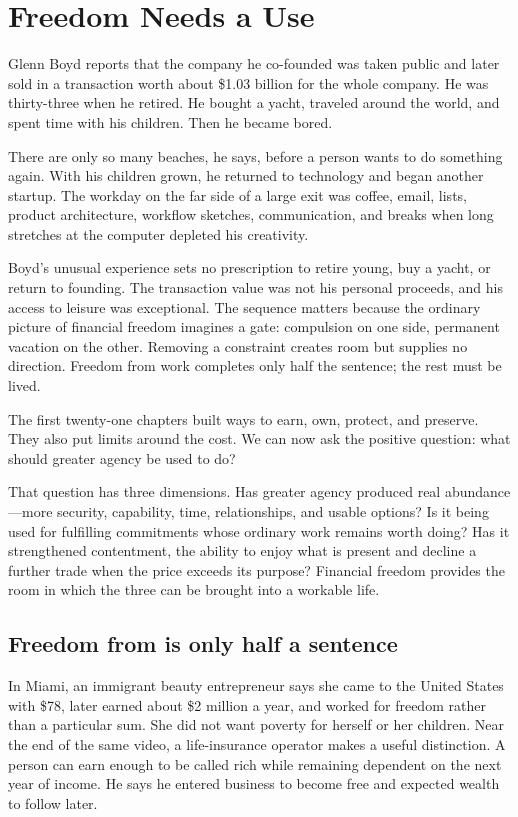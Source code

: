 \chapter{Freedom Needs a Use}

Glenn Boyd reports that the company he co-founded was taken public and later
sold in a transaction worth about \$1.03 billion for the whole company. He was
thirty-three when he retired. He bought a yacht, traveled around the world,
and spent time with his children. Then he became bored.

There are only so many beaches, he says, before a person wants to do something
again. With his children grown, he returned to technology and began another
startup. The workday on the far side of a large exit was coffee, email, lists,
product architecture, workflow sketches, communication, and breaks when long
stretches at the computer depleted his creativity.

Boyd's unusual experience sets no prescription to retire young, buy a yacht,
or return to founding. The transaction value was not his personal proceeds,
and his access to leisure was exceptional. The sequence matters because the
ordinary picture of financial freedom imagines a gate: compulsion on one side,
permanent vacation on the other. Removing a constraint creates room but
supplies no direction. Freedom from work completes only half the sentence; the
rest must be lived.

The first twenty-one chapters built ways to earn, own, protect, and preserve.
They also put limits around the cost. We can now ask the positive question:
what should greater agency be used to do?

That question has three dimensions. Has greater agency produced real
abundance---more security, capability, time, relationships, and usable options?
Is it being used for fulfilling commitments whose ordinary work remains worth
doing? Has it strengthened contentment, the ability to enjoy what is present
and decline a further trade when the price exceeds its purpose? Financial
freedom provides the room in which the three can be brought into a workable
life.

\section{Freedom from is only half a sentence}

In Miami, an immigrant beauty entrepreneur says she came to the United States
with \$78, later earned about \$2 million a year, and worked for freedom rather
than a particular sum. She did not want poverty for herself or her children.
Near the end of the same video, a life-insurance operator makes a useful
distinction. A person can earn enough to be called rich while remaining
dependent on the next year of income. He says he entered business to become
free and expected wealth to follow later.

